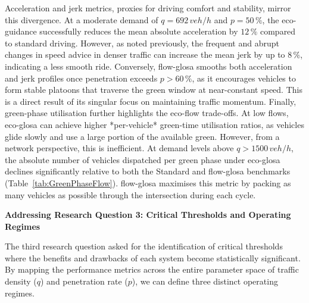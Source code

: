 \mynewline
Acceleration and jerk metrics, proxies for driving comfort and stability, mirror this divergence. At a moderate demand of $q=692\,\unit{veh/h}$ and $p=50\,\%$, the eco-guidance successfully reduces the mean absolute acceleration by $12\,\%$ compared to standard driving. However, as noted previously, the frequent and abrupt changes in speed advice in denser traffic can increase the mean jerk by up to $8\,\%$, indicating a less smooth ride. Conversely, \ac{flow-glosa} smooths both acceleration and jerk profiles once penetration exceeds $p>60\,\%$, as it encourages vehicles to form stable platoons that traverse the green window at near-constant speed. This is a direct result of its singular focus on maintaining traffic momentum.
\mynewline
Finally, green-phase utilisation further highlights the eco-flow trade-offs. At low flows, \ac{eco-glosa} can achieve higher *per-vehicle* green-time utilisation ratios, as vehicles glide slowly and use a large portion of the available green. However, from a network perspective, this is inefficient. At demand levels above $q>1500\,\unit{veh/h}$, the absolute number of vehicles dispatched per green phase under \ac{eco-glosa} declines significantly relative to both the Standard and \ac{flow-glosa} benchmarks (Table~\ref{tab:GreenPhaseFlow}). \ac{flow-glosa} maximises this metric by packing as many vehicles as possible through the intersection during each cycle.

\bigskip
\textbf{Addressing Research Question 3: Critical Thresholds and Operating Regimes}

The third research question asked for the identification of critical thresholds where the benefits and drawbacks of each system become statistically significant. By mapping the performance metrics across the entire parameter space of traffic density ($q$) and penetration rate ($p$), we can define three distinct operating regimes.

